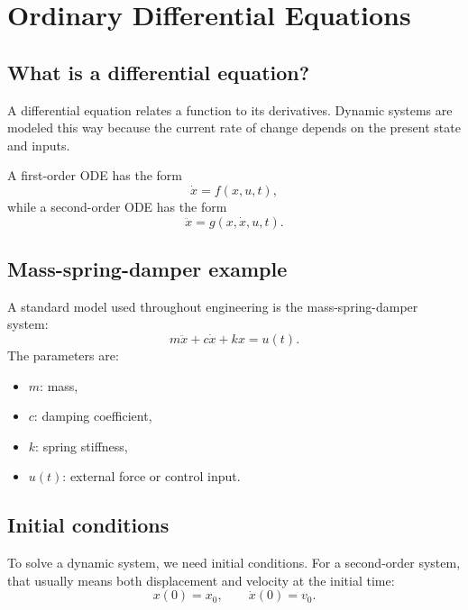 \documentclass[11pt]{article}
\begin{document}
\section{Ordinary Differential Equations}

\subsection{What is a differential equation?}

A differential equation relates a function to its derivatives. Dynamic systems are modeled this way because the current rate of change depends on the present state and inputs.

A first-order ODE has the form
\begin{equation}
\dot{x}=f(x,u,t),
\end{equation}
while a second-order ODE has the form
\begin{equation}
\ddot{x}=g(x,\dot{x},u,t).
\end{equation}

\subsection{Mass-spring-damper example}

A standard model used throughout engineering is the mass-spring-damper system:
\begin{equation}
 m\ddot{x}+c\dot{x}+kx=u(t).
\end{equation}
The parameters are:
\begin{itemize}[leftmargin=1.4em]
  \item $m$: mass,
  \item $c$: damping coefficient,
  \item $k$: spring stiffness,
  \item $u(t)$: external force or control input.
\end{itemize}

\subsection{Initial conditions}

To solve a dynamic system, we need initial conditions. For a second-order system, that usually means both displacement and velocity at the initial time:
\begin{equation}
 x(0)=x_0,
 \qquad
 \dot{x}(0)=v_0.
\end{equation}
\end{document}
